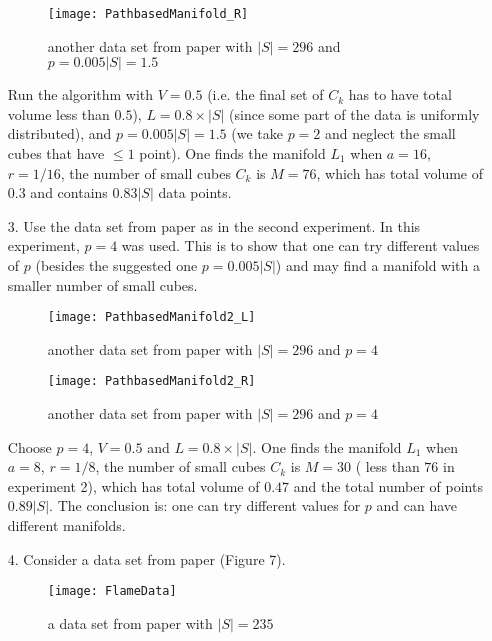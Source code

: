 \documentclass[12pt]{article}
\theoremstyle{plain}
\begin{document}
\begin{itemize}
\begin{figure}[H]
  \centering
      \texttt{[image: PathbasedManifold\_R]}
  \caption{another data set from paper \cite{Chang} with $|S| = 296$ and $p = 0.005|S| = 1.5$}
\end{figure}

\noindent Run the algorithm with $V = 0.5$ (i.e. the final set of $C_k$ has to have total volume less than $0.5$), $L = 0.8 \times |S|$
(since some part of the data is uniformly distributed), and $p = 0.005|S| = 1.5$ (we take $p=2$ and  neglect the small cubes that have
 $\le 1$ point). One finds the manifold $L_1$ when $a = 16$, $r = 1/16$, the number of small cubes $C_k$ is $M = 76$, which has total volume of
 $0.3$ and contains $0.83|S|$ data points.\\

\item[3.] Use the data set from paper \cite{Chang} as in the second experiment. In this experiment, $p = 4$ was used. This is to show that one
can try different values of $p$ (besides the suggested one $p = 0.005|S|$) and may find a manifold with a smaller number of small cubes.

\begin{figure}[H]
  \centering
      \texttt{[image: PathbasedManifold2\_L]}
  \caption{another data set from paper \cite{Chang}  with $|S| = 296$ and $p = 4$}
\end{figure}

\begin{figure}[H]
  \centering
      \texttt{[image: PathbasedManifold2\_R]}
  \caption{another data set from paper \cite{Chang}  with $|S| = 296$ and $p = 4$}
\end{figure}

\noindent Choose $p = 4$, $V = 0.5$ and $L = 0.8 \times |S|$. One finds the manifold $L_1$ when $a = 8$, $r = 1/8$, the number of small cubes
$C_k$ is $M = 30$ ( less than $76$ in experiment 2), which has total volume of $0.47$ and the total number of points  $0.89|S|$.
 The conclusion is:  one can try different values for $p$ and can have different manifolds.

\item[4.] Consider a data set from paper \cite{Fu} (Figure 7).

\begin{figure}[H]
  \centering
	\texttt{[image: FlameData]}
  \caption{a data set from paper \cite{Fu} with $|S| = 235$}
\end{figure}


\end{itemize}
\end{document}
